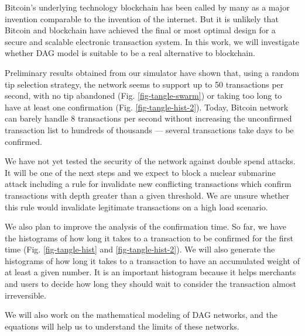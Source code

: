 Bitcoin's underlying technology blockchain has been called by many as a major invention comparable to the invention of the internet. But it is unlikely that Bitcoin and blockchain have achieved the final or most optimal design for a secure and scalable electronic transaction system. In this work, we will investigate whether DAG model is suitable to be a real alternative to blockchain.

Preliminary results obtained from our simulator have shown that, using a random tip selection strategy, the network seems to support up to 50 transactions per second, with no tip abandoned (Fig. \ref{fig-tangle-swarm}) or taking too long to have at least one confirmation (Fig. \ref{fig-tangle-hist-2}). Today, Bitcoin network can barely handle 8 transactions per second without increasing the unconfirmed transaction list to hundreds of thousands --- several transactions take days to be confirmed.

We have not yet tested the security of the network against double spend attacks. It will be one of the next steps and we expect to block a nuclear submarine attack including a rule for invalidate new conflicting transactions which confirm transactions with depth greater than a given threshold. We are unsure whether this rule would invalidate legitimate transactions on a high load scenario.

We also plan to improve the analysis of the confirmation time. So far, we have the histograms of how long it takes to a transaction to be confirmed for the first time (Fig. \ref{fig-tangle-hist} and \ref{fig-tangle-hist-2}). We will also generate the histograms of how long it takes to a transaction to have an accumulated weight of at least a given number. It is an important histogram because it helps merchants and users to decide how long they should wait to consider the transaction almost irreversible.

We will also work on the mathematical modeling of DAG networks, and the equations will help us to understand the limits of these networks.

